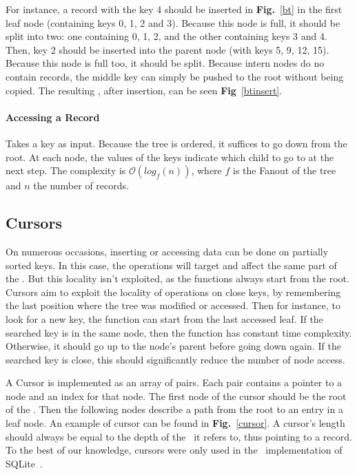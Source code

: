 For instance, a record with the key 4 should be inserted in \textbf{Fig.}~\ref{bt} in the first leaf node (containing keys 0, 1, 2 and 3).
Because this node is full, it should be split into two: one containing 0, 1, 2, and the other containing keys 3 and 4.
Then, key 2 should be inserted into the parent node (with keys 5, 9, 12, 15).
Because this node is full too, it should be split.
Because intern nodes do no contain records, the middle key can simply be pushed to the root without being copied.
The resulting \btree, after insertion, can be seen \textbf{Fig}~\ref{btinsert}.

\beforeinsert
\afterinsert

\paragraph{Accessing a Record} Takes a key as input. Because the tree is ordered, it suffices to go down from the root.
At each node, the values of the keys indicate which child to go to at the next step.
The complexity is $\mathcal{O}(log_{f}(n))$, where $f$ is the Fanout of the tree and $n$ the number of records.

\subsection{Cursors}
On numerous occasions, inserting or accessing data can be done on partially sorted keys.
In this case, the operations will target and affect the same part of the \btree.
But this locality isn't exploited, as the functions always start from the root.
Cursors aim to exploit the locality of operations on close keys, by remembering the last position where the tree was modified or accessed.
Then for instance, to look for a new key, the function can start from the last accessed leaf. If the searched key is in the same node, then the function has constant time complexity.
Otherwise, it should go up to the node's parent before going down again. If the searched key is close, this should significantly reduce the number of node access.

A Cursor is implemented as an array of pairs. Each pair contains a pointer to a node and an index for that node.
The first node of the cursor should be the root of the \btree.
Then the following nodes describe a path from the root to an entry in a leaf node.
An example of cursor can be found in \textbf{Fig.}~\ref{cursor}.
A cursor's length should always be equal to the depth of the \btree\ it refers to, thus pointing to a record.
To the best of our knowledge, cursors were only used in the \btrees\ implementation of SQLite~\cite{sqlite}.

